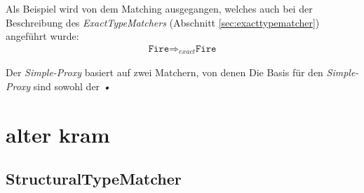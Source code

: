 \documentclass[a4paper,12pt]{article}
\begin{document}
Als Beispiel wird von dem Matching ausgegangen, welches auch bei der Beschreibung des \emph{ExactTypeMatchers} (Abschnitt \ref{sec:exacttypematcher}) angeführt wurde:
\begin{gather*}
\texttt{Fire} \Rightarrow_{exact} \texttt{Fire}
\end{gather*}

 
Der \emph{Simple-Proxy} basiert auf zwei Matchern, von denen 
Die Basis für den \emph{Simple-Proxy} sind sowohl der \emph{•}

\section{alter kram}
\subsection{StructuralTypeMatcher}
\end{document}
